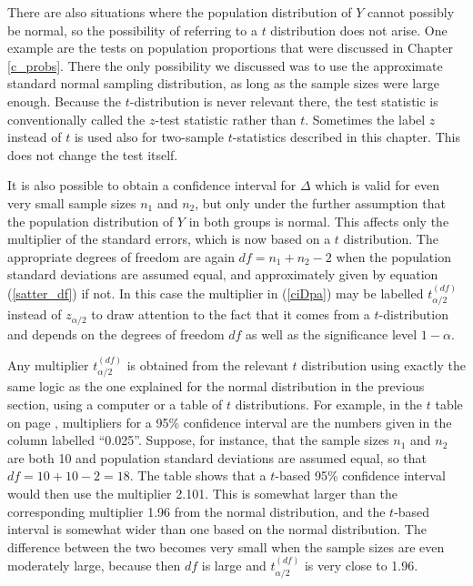 There are also situations where the population distribution of $Y$
cannot possibly be normal, so the possibility of referring to a $t$
distribution does not arise. One example are the tests on population
proportions that were discussed in Chapter \ref{c_probs}. There the only
possibility we discussed was to use the approximate standard normal
sampling distribution, as long as the sample sizes were large enough.
Because the $t$-distribution is never relevant there, the test statistic
is conventionally called the $z$-test statistic rather than $t$.
Sometimes the label $z$ instead of $t$ is used also for two-sample
$t$-statistics described in this chapter. This does not change the test
itself.


It is also possible to obtain a confidence interval for $\Delta$ which
is valid for even very small sample sizes $n_{1}$ and $n_{2}$, but only
under the further assumption that the population distribution of $Y$ in
both groups is normal. This affects only the multiplier
of the standard errors, which is now based on a $t$ distribution. The appropriate degrees of
freedom are again $df=n_{1}+n_{2}-2$ when the population standard
deviations are assumed equal, and approximately given by equation
(\ref{satter_df}) if not. In this case the multiplier in (\ref{ciDpa})
may be labelled $t^{(df)}_{\alpha/2}$ instead of $z_{\alpha/2}$ to draw
attention to the fact that it comes from a $t$-distribution and
depends on the degrees of freedom $df$ as well as
the significance level $1-\alpha$.

Any multiplier $t_{\alpha/2}^{(df)}$ is obtained from the relevant $t$
distribution using exactly the same logic as the one explained for the
normal distribution in the previous section, using a computer or a table
of $t$ distributions. For example, in the $t$ table on page
\pageref{s_disttables_t}, multipliers for a 95\% confidence interval are
the numbers given in the column labelled ``0.025''. Suppose, for
instance, that the sample sizes $n_{1}$ and $n_{2}$ are both 10 and
population standard deviations are assumed equal, so that
$df=10+10-2=18$. The table shows that a $t$-based 95\% confidence
interval would then use the multiplier 2.101. This is somewhat larger
than the corresponding multiplier 1.96 from the normal distribution, and
the $t$-based interval is somewhat wider than one based on the normal
distribution. The difference between the two becomes very small when the
sample sizes are even moderately large, because then $df$ is large and
$t_{\alpha/2}^{(df)}$ is very close to 1.96.

